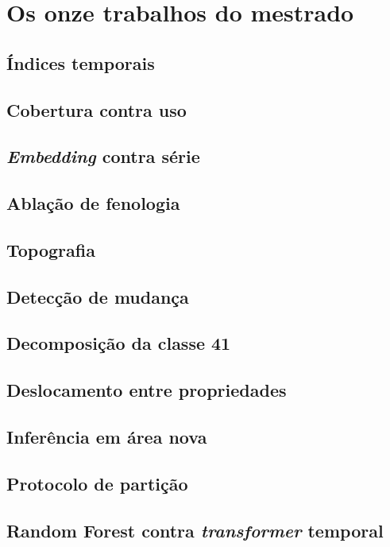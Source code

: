 \section{Os onze trabalhos do mestrado}

\lipsum[40][1-3]

\subsection{Índices temporais}

\lipsum[41][1-3]

\subsection{Cobertura contra uso}

\lipsum[42][1-3]

\subsection{\emph{Embedding} contra série}

\lipsum[43][1-3]

\subsection{Ablação de fenologia}

\lipsum[44][1-3]

\subsection{Topografia}

\lipsum[45][1-3]

\subsection{Detecção de mudança}

\lipsum[46][1-3]

\subsection{Decomposição da classe 41}

\lipsum[47][1-3]

\subsection{Deslocamento entre propriedades}

\lipsum[48][1-3]

\subsection{Inferência em área nova}

\lipsum[49][1-3]

\subsection{Protocolo de partição}

\lipsum[50][1-3]

\subsection{Random Forest contra \emph{transformer} temporal}

\lipsum[51][1-3]
